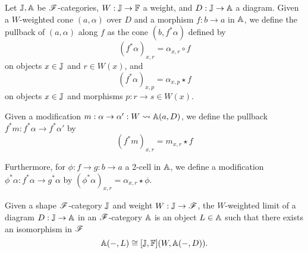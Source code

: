 \documentclass[../thesis.tex]{subfiles}
\begin{document}
  \begin{definition}
    Let ${\mathbb{J}}, {\mathbb{A}}$ be ${\mathscr{F}}$-categories, $W : {\mathbb{J}} \to {\mathbb{F}}$ a weight, and $D : {\mathbb{J}} \to {\mathbb{A}}$ a diagram.
    Given a $W$-weighted cone $(a,\alpha)$ over $D$ and a morphism $f : b \to a$ in ${\mathbb{A}}$, we define
    the pullback of $(a,\alpha)$ along $f$ as the cone $(b,f^*\alpha)$ defined by
    \[(f^*\alpha)_{x,r} = \alpha_{x,r} \circ f\]
    on objects $x \in {\mathbb{J}}$ and $r \in W(x)$, and
    \[(f^*\alpha)_{x,p} = \alpha_{x,p} \star f\]
    on objects $x \in {\mathbb{J}}$ and morphisms $p : r \to s \in W(x)$.
  
    Given a modification $m : \alpha \to \alpha' : W \rightsquigarrow {\mathbb{A}}(a,D)$, we define the pullback $f^*m : f^*\alpha
    \to f^*\alpha'$ by
    \[(f^*m)_{x,r} = m_{x,r} \star f\]


    Furthermore, for $\phi : f \to g : b \to a$ a 2-cell in ${\mathbb{A}}$, we define a modification $\phi^*\alpha :
    f^*\alpha \to g^*\alpha$ by \((\phi^*\alpha)_{x,r} = \alpha_{x,r} \star \phi\).
  \end{definition}

  \begin{definition}
    Given a shape ${\mathscr{F}}$-category ${\mathbb{J}}$ and weight $W : {\mathbb{J}} \to {\mathscr{F}}$, the $W$-weighted limit of a diagram
    $D : {\mathbb{J}} \to {\mathbb{A}}$ in an ${\mathscr{F}}$-category ${\mathbb{A}}$ is an object $L \in {\mathbb{A}}$ such that there exists an
    isomorphism in ${\mathscr{F}}$
    \[{\mathbb{A}}(-,L) \cong [{\mathbb{J}},{\mathbb{F}}](W,{\mathbb{A}}(-,D)).\]
  \end{definition}
\end{document}
